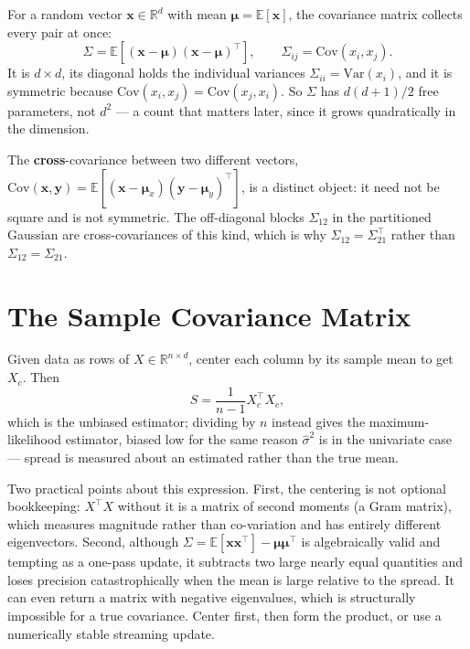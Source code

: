 \documentclass[conference]{IEEEtran}
\begin{document}
For a random vector $\mathbf{x} \in \mathbb{R}^d$ with mean $\boldsymbol{\mu} = \mathbb{E}[\mathbf{x}]$, the covariance matrix collects every pair at once:
\begin{equation}
    \Sigma = \mathbb{E}\!\left[(\mathbf{x}-\boldsymbol{\mu})(\mathbf{x}-\boldsymbol{\mu})^{\!\top}\right],
    \qquad
    \Sigma_{ij} = \mathrm{Cov}(x_i, x_j).
\end{equation}
It is $d \times d$, its diagonal holds the individual variances $\Sigma_{ii} = \mathrm{Var}(x_i)$, and it is symmetric because $\mathrm{Cov}(x_i,x_j) = \mathrm{Cov}(x_j,x_i)$. So $\Sigma$ has $d(d+1)/2$ free parameters, not $d^2$ --- a count that matters later, since it grows quadratically in the dimension.

The \textbf{cross}-covariance between two different vectors, $\mathrm{Cov}(\mathbf{x},\mathbf{y}) = \mathbb{E}[(\mathbf{x}-\boldsymbol{\mu}_x)(\mathbf{y}-\boldsymbol{\mu}_y)^{\!\top}]$, is a distinct object: it need not be square and is not symmetric. The off-diagonal blocks $\Sigma_{12}$ in the partitioned Gaussian are cross-covariances of this kind, which is why $\Sigma_{12} = \Sigma_{21}^{\top}$ rather than $\Sigma_{12} = \Sigma_{21}$.

\section*{The Sample Covariance Matrix}
Given data as rows of $X \in \mathbb{R}^{n \times d}$, center each column by its sample mean to get $X_c$. Then
\begin{equation}
    S = \frac{1}{n-1} X_c^{\!\top} X_c ,
\end{equation}
which is the unbiased estimator; dividing by $n$ instead gives the maximum-likelihood estimator, biased low for the same reason $\hat{\sigma}^2$ is in the univariate case --- spread is measured about an estimated rather than the true mean.

Two practical points about this expression. First, the centering is not optional bookkeeping: $X^{\!\top}X$ without it is a matrix of second moments (a Gram matrix), which measures magnitude rather than co-variation and has entirely different eigenvectors. Second, although $\Sigma = \mathbb{E}[\mathbf{x}\mathbf{x}^{\!\top}] - \boldsymbol{\mu}\boldsymbol{\mu}^{\!\top}$ is algebraically valid and tempting as a one-pass update, it subtracts two large nearly equal quantities and loses precision catastrophically when the mean is large relative to the spread. It can even return a matrix with negative eigenvalues, which is structurally impossible for a true covariance. Center first, then form the product, or use a numerically stable streaming update.
\end{document}
